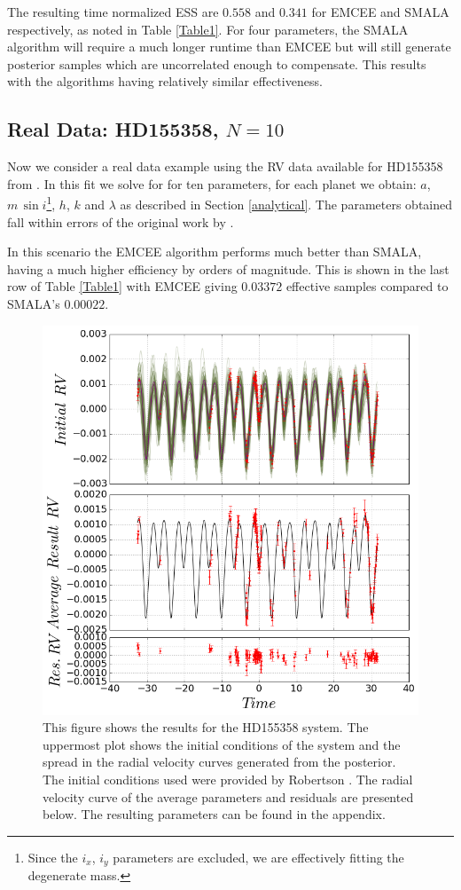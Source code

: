 \documentclass{aa}
\begin{document}
The resulting time normalized ESS are $0.558$ and $0.341$ for EMCEE and SMALA respectively, as noted in Table \ref{Table1}. For four parameters, the SMALA algorithm will require a much longer runtime than EMCEE but will still generate posterior samples which are uncorrelated enough to compensate. This results with the algorithms having relatively similar effectiveness.


\subsection{Real Data: HD155358, $N=10$}

Now we consider a real data example using the RV data available for HD155358 from \cite{Robertson2012}. In this fit we solve for for ten parameters, for each planet we obtain: $a$, $m\, \sin i$\footnote{Since the $i_x$, $i_y$ parameters are excluded, we are effectively fitting the degenerate mass.}, $h$, $k$ and $\lambda$ as described in Section \ref{analytical}. The parameters obtained fall within errors of the original work by \cite{Robertson2012}.

In this scenario the EMCEE algorithm performs much better than SMALA, having a much higher efficiency by orders of magnitude. This is shown in the last row of Table \ref{Table1} with EMCEE giving $0.03372$ effective samples compared to SMALA's $0.00022$.  

\begin{figure}
\centering
\includegraphics[width=0.95\hsize]{rv3.png}
   \caption{This figure shows the results for the HD155358 system. The uppermost plot shows the initial conditions of the system and the spread in the radial velocity curves generated from the posterior. The initial conditions used were provided by Robertson \cite{Robertson2012}. The radial velocity curve of the average parameters and residuals are presented below. The resulting parameters can be found in the appendix.}
      \label{FigHD}
\end{figure}
\end{document}
